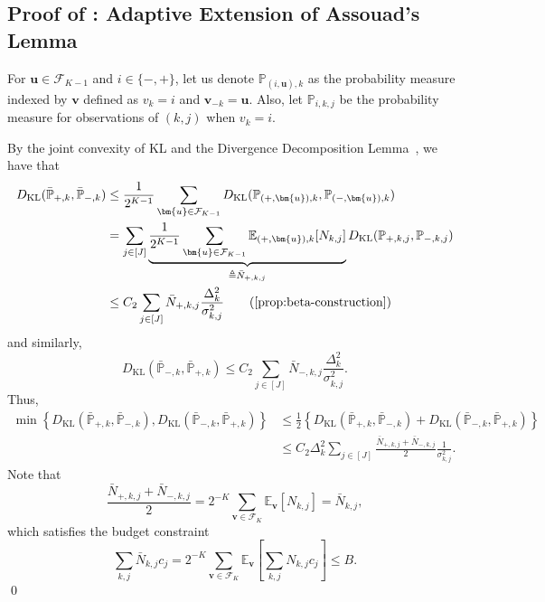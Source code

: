 \documentclass{article}
\def\vu{{\bm{u}}}
\def\vv{{\bm{v}}}
\def\gF{{\mathcal{F}}}
\def\sP{{\mathbb{P}}}
\newcommand{\E}{\mathbb{E}}
\newcommand{\KL}{D_{\mathrm{KL}}}
\theoremstyle{plain}
\theoremstyle{definition}
\theoremstyle{plain}
\begin{document}
\subsection{\texorpdfstring{Proof of : Adaptive Extension of Assouad's Lemma}{Proof of Lemma D.2: Adaptive Extension of Assouad's Lemma}}
\label{app:assouad-adaptive}
For $\vu \in \gF_{K-1}$ and $i \in \{-, +\}$, let us denote $\sP_{(i,\vu),k}$ as the probability measure indexed by $\vv$ defined as $v_k = i$ and $\vv_{-k} = \vu$.
Also, let $\sP_{i,k,j}$ be the probability measure for observations of $(k, j)$ when $v_k = i$.

By the joint convexity of KL and the Divergence Decomposition Lemma~\citep[Lemma 15.1]{banditalgorithms}, we have that
\begin{align}
    \KL(\bar{\sP}_{+,k}, \bar{\sP}_{-,k}) &\leq \frac{1}{2^{K-1}} 
    \sum_{\vu \in \gF_{K-1}} \KL(\sP_{(+,\vu),k}, \sP_{(-,\vu),k}) \\
    &= \sum_{j \in [J]} \underbrace{\frac{1}{2^{K-1}} 
    \sum_{\vu \in \gF_{K-1}} \E_{(+,\vu),k}[N_{k,j}]}_{\triangleq \bar{N}_{+,k,j}} \KL(\sP_{+,k,j}, \sP_{-,k,j}) \\
    &\leq C_2 \sum_{j \in [J]}  \bar{N}_{+,k,j} \frac{\Delta_k^2}{\sigma_{k,j}^2} \tag{\Cref{prop:beta-construction}}
\end{align}
and similarly,
\begin{equation}
    \KL(\bar{\sP}_{-,k}, \bar{\sP}_{+,k}) \leq C_2 \sum_{j \in [J]}  \bar{N}_{-,k,j} \frac{\Delta_k^2}{\sigma_{k,j}^2}.
\end{equation}
Thus,
\begin{align}
    \min\left\{ \KL(\bar{\sP}_{+,k}, \bar{\sP}_{-,k}), \KL(\bar{\sP}_{-,k}, \bar{\sP}_{+,k}) \right\} &\leq \frac{1}{2} \left\{ \KL(\bar{\sP}_{+,k}, \bar{\sP}_{-,k}) + \KL(\bar{\sP}_{-,k}, \bar{\sP}_{+,k}) \right\} \\
    &\leq C_2 \Delta_k^2 \sum_{j \in [J]} \frac{\bar{N}_{+,k,j} + \bar{N}_{-,k,j}}{2} \frac{1}{\sigma_{k,j}^2}.
\end{align}
Note that
\begin{equation}
    \frac{\bar{N}_{+,k,j} + \bar{N}_{-,k,j}}{2} = 2^{-K} \sum_{\vv \in \gF_K} \E_\vv[N_{k,j}] = \bar{N}_{k,j},
\end{equation}
which satisfies the budget constraint
\begin{equation}
    \sum_{k,j} \bar{N}_{k,j} c_j = 2^{-K} \sum_{\vv \in \gF_K} \E_\vv\left[ \sum_{k,j} N_{k,j} c_j \right] \leq B.
\end{equation}
\qed
\end{document}
